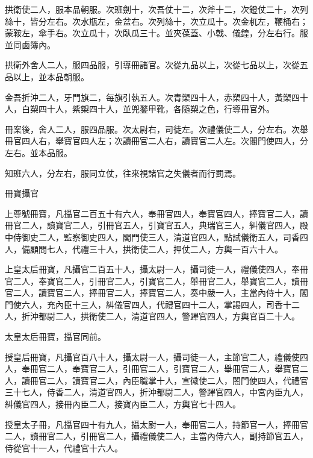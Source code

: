\begin{pinyinscope}
 拱衛使二人，服本品朝服。次班劍十，次吾仗十二，次斧十二，次鐙仗二十，次列絲十，皆分左右。次水瓶左，金盆右。次列絲十，次立瓜十。次金杌左，鞭桶右；蒙鞍左，傘手右。次立瓜十，次臥瓜三十。並夾葆蓋、小戟、儀鍠，分左右行。服並同鹵簿內。



 拱衛外舍人二人，服四品服，引導冊諸官。次從九品以上，次從七品以上，次從五品以上，並本品朝服。



 金吾折沖二人，牙門旗二，每旗引執五人。次青槊四十人，赤槊四十人，黃槊四十人，白槊四十人，紫槊四十人，並兜鍪甲靴，各隨槊之色，行導冊官外。



 冊案後，舍人二人，服四品服。次太尉右，司徒左。次禮儀使二人，分左右。次舉冊官四人右，舉寶官四人左；次讀冊官二人右，讀寶官二人左。次閣門使四人，分左右。並本品服。



 知班六人，分左右，服同立仗，往來視諸官之失儀者而行罰焉。



 冊寶攝官



 上尊號冊寶，凡攝官二百五十有六人，奉冊官四人，奉寶官四人，捧寶官二人，讀冊官二人，讀寶官二人，引冊官五人，引寶官五人，典瑞官三人，糾儀官四人，殿中侍御史二人，監察御史四人，閣門使三人，清道官四人，點試儀衛五人，司香四人，備顧問七人，代禮三十人，拱衛使二人，押仗二人，方輿一百六十人。



 上皇太后冊寶，凡攝官二百五十人，攝太尉一人，攝司徒一人，禮儀使四人，奉冊官二人，奉寶官二人，引冊官二人，引寶官二人，舉冊官二人，舉寶官二人，讀冊官二人，讀寶官二人，捧冊官二人，捧寶官二人，奏中嚴一人，主當內侍十人，閣門使六人，充內臣十三人，糾儀官四人，代禮官四十二人，掌謁四人，司香十二人，折沖都尉二人，拱衛使二人，清道官四人，警蹕官四人，方輿官百二十人。



 太皇太后冊寶，攝官同前。



 授皇后冊寶，凡攝官百八十人，攝太尉一人，攝司徒一人，主節官二人，禮儀使四人，奉冊官二人，奉寶官二人，引冊官二人，引寶官二人，舉冊官二人，舉寶官二人，讀冊官二人，讀寶官二人，內臣職掌十人，宣徽使二人，閤門使四人，代禮官三十七人，侍香二人，清道官四人，折沖都尉二人，警蹕官四人，中宮內臣九人，糾儀官四人，接冊內臣二人，接寶內臣二人，方輿官七十四人。



 授皇太子冊，凡攝官四十有九人，攝太尉一人，奉冊官二人，持節官一人，捧冊官二人，讀冊官二人，引冊官二人，攝禮儀使二人，主當內侍六人，副持節官五人，侍從官十一人，代禮官十六人。




\end{pinyinscope}
